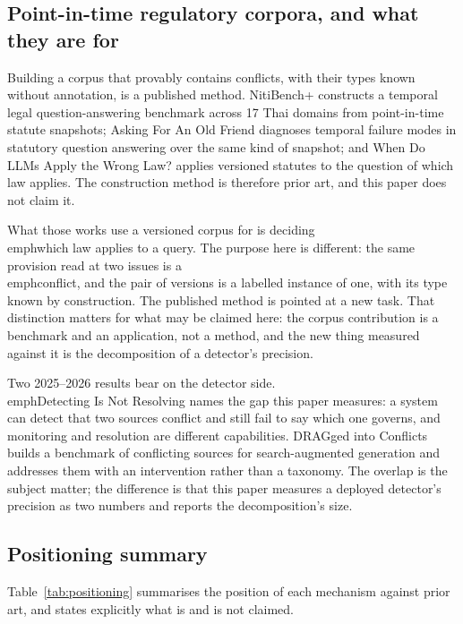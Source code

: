 \documentclass[preprint,3p,times]{elsarticle}
\begin{document}
\subsection{Point-in-time regulatory corpora, and what they are for}

Building a corpus that provably contains conflicts, with their types known
without annotation, is a published method. NitiBench+\cite{akarajaradwong2026nitibench}
constructs a temporal legal question-answering benchmark across 17 Thai
domains from point-in-time statute snapshots; Asking For An Old Friend
\cite{prior2026oldfriend} diagnoses temporal failure modes in statutory
question answering over the same kind of snapshot; and When Do LLMs Apply the
Wrong Law?\cite{huang2026wronglaw} applies versioned statutes to the question of
which law applies. The construction method is therefore prior art, and this
paper does not claim it.

What those works use a versioned corpus for is deciding \\emph{which law
applies} to a query. The purpose here is different: the same provision read
at two issues is a \\emph{conflict}, and the pair of versions is a labelled
instance of one, with its type known by construction. The published method
is pointed at a new task. That distinction matters for what may be claimed
here: the corpus contribution is a benchmark and an application, not a
method, and the new thing measured against it is the decomposition of a
detector's precision.

Two 2025--2026 results bear on the detector side. \\emph{Detecting Is Not
Resolving}\cite{yu2026detecting} names the gap this paper measures: a system
can detect that two sources conflict and still fail to say which one governs,
and monitoring and resolution are different capabilities. DRAGged into
Conflicts\cite{cattan2025dragged} builds a benchmark of conflicting sources
for search-augmented generation and addresses them with an intervention
rather than a taxonomy. The overlap is the subject matter; the difference is
that this paper measures a deployed detector's precision as two numbers and
reports the decomposition's size.

\subsection{Positioning summary}

Table~\ref{tab:positioning} summarises the position of each mechanism against
prior art, and states explicitly what is and is not claimed.
\end{document}
